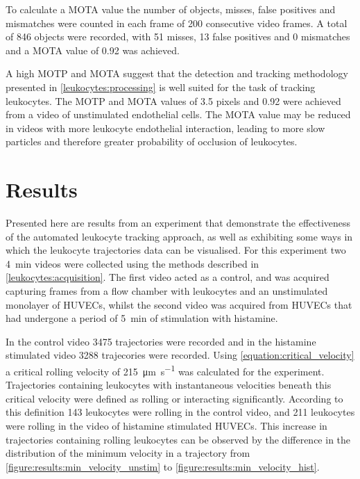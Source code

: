 To calculate a MOTA value the number of objects, misses, false positives and mismatches were counted in each frame of 200 consecutive video frames. A total of 846 objects were recorded, with 51 misses, 13 false positives and 0 mismatches and a MOTA value of 0.92 was achieved.

A high MOTP and MOTA suggest that the detection and tracking methodology presented in \autoref{leukocytes:processing} is well suited for the task of tracking leukocytes. The MOTP and MOTA values of 3.5 pixels and 0.92 were achieved from a video of unstimulated endothelial cells. The MOTA value may be reduced in videos with more leukocyte endothelial interaction, leading to more slow particles and therefore greater probability of occlusion of leukocytes.

\section{Results}
\label{leukocytes:results}
Presented here are results from an experiment that demonstrate the effectiveness of the automated leukocyte tracking approach, as well as exhibiting some ways in which the leukocyte trajectories data can be visualised. For this experiment two \SI{4}{\minute} videos were collected using the methods described in \autoref{leukocytes:acquisition}. The first video acted as a control, and was acquired capturing frames from a flow chamber with leukocytes and an unstimulated monolayer of HUVECs, whilst the second video was acquired from HUVECs that had undergone a period of \SI{5}{\minute} of stimulation with histamine.

In the control video 3475 trajectories were recorded and in the histamine stimulated video 3288 trajecories were recorded. Using \autoref{equation:critical_velocity} a critical rolling velocity of \SI{215}{\micro\meter\per\second} was calculated for the experiment. Trajectories containing leukocytes with instantaneous velocities beneath this critical velocity were defined as rolling or interacting significantly. According to this definition 143 leukocytes were rolling in the control video, and 211 leukocytes were rolling in the video of histamine stimulated HUVECs. This increase in trajectories containing rolling leukocytes can be observed by the difference in the distribution of the minimum velocity in a trajectory from \autoref{figure:results:min_velocity_unstim} to \autoref{figure:results:min_velocity_hist}.

